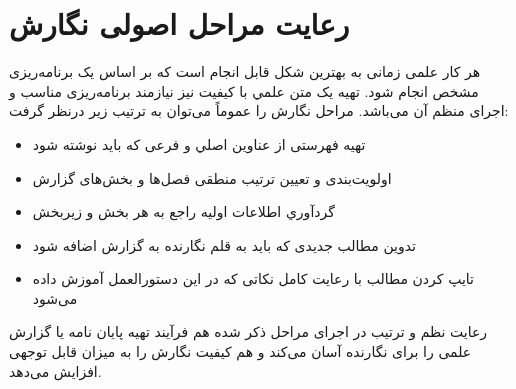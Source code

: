 \section{رعایت مراحل اصولی نگارش}
هر کار علمی زمانی به بهترین شکل قابل انجام است که بر اساس یک برنامه‌ریزی مشخص انجام شود. تهیه یک متن علمي با کیفیت نیز نیازمند برنامه‌ریزی مناسب و اجرای منظم آن می‌باشد. مراحل نگارش را عموماً می‌توان به ترتیب زیر درنظر گرفت:
\begin{itemize}


\item	تهيه فهرستی از عناوین اصلي و فرعی که باید نوشته شود
\item 	اولویت‌بندی و تعیین ترتیب منطقی فصل‌ها و بخش‌های گزارش
\item 	گردآوري اطلاعات اولیه راجع به هر بخش و زیربخش
\item 	تدوین مطالب جدیدی که باید به قلم نگارنده به گزارش اضافه شود
\item 	تایپ كردن مطالب با رعایت کامل نکاتی که در این دستورالعمل آموزش داده می‌شود
\end{itemize}
رعایت نظم و ترتیب در اجرای مراحل ذکر شده هم فرآیند تهیه پایان نامه یا گزارش علمی را برای نگارنده آسان می‌کند و هم کیفیت نگارش را به میزان قابل توجهی افزایش می‌دهد.
















